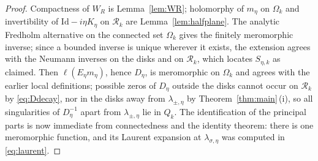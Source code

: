 \documentclass[11pt,a4paper]{amsart}
\theoremstyle{definition}
\theoremstyle{remark}
\newcommand{\Id}{\mathrm{Id}}
\newcommand{\ellf}{\ell}
\begin{document}
\begin{proof}
Compactness of $W_R$ is Lemma~\ref{lem:WR}; holomorphy of $m_\eta$ on $\Omega_k$ and invertibility of $\Id-i\eta K_\eta$ on $\mathcal R_k$ are Lemma~\ref{lem:halfplane}. The analytic Fredholm alternative on the connected set $\Omega_k$ gives the finitely meromorphic inverse; since a bounded inverse is unique wherever it exists, the extension agrees with the Neumann inverses on the disks and on $\mathcal R_k$, which locates $S_{\eta,k}$ as claimed. Then $\ellf(E_\eta m_\eta)$, hence $D_\eta$, is meromorphic on $\Omega_k$ and agrees with the earlier local definitions; possible zeros of $D_\eta$ outside the disks cannot occur on $\mathcal R_k$ by \eqref{eq:Ddecay}, nor in the disks away from $\lambda_{\pm,\eta}$ by Theorem~\ref{thm:main}\,(i), so all singularities of $D_\eta^{-1}$ apart from $\lambda_{\pm,\eta}$ lie in $Q_k$. The identification of the principal parts is now immediate from connectedness and the identity theorem: there is one meromorphic function, and its Laurent expansion at $\lambda_{\sigma,\eta}$ was computed in \eqref{eq:laurent}.
\end{proof}
\end{document}

